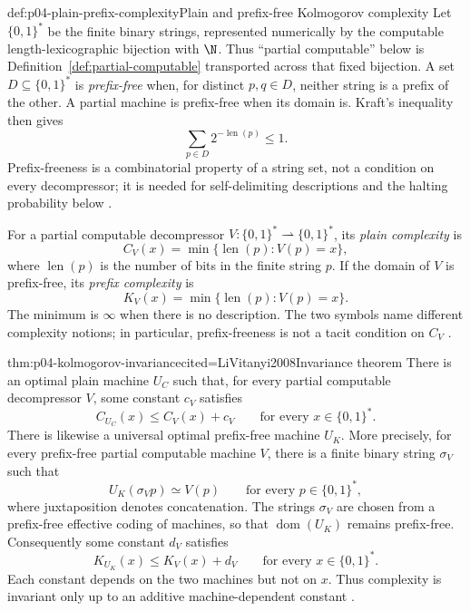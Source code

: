 \begin{hbdefinition}{def:p04-plain-prefix-complexity}{Plain and prefix-free Kolmogorov complexity}
Let \(\{0,1\}^*\) be the finite binary strings, represented numerically by
the computable length-lexicographic bijection with \(\N\).  Thus ``partial
computable'' below is Definition~\ref{def:partial-computable} transported
across that fixed bijection.  A set \(D\subseteq\{0,1\}^*\) is
\emph{prefix-free} when, for distinct \(p,q\in D\), neither string is a prefix
of the other.  A partial machine is prefix-free when its domain is.  Kraft's
inequality then gives
\[
 \sum_{p\in D}2^{-\operatorname{len}(p)}\leq1.
\]
Prefix-freeness is a combinatorial property of a string set, not a condition on
every decompressor; it is needed for self-delimiting descriptions and the
halting probability below \cite{LiVitanyi2008}.

For a partial computable
decompressor \(V:\{0,1\}^*\rightharpoonup\{0,1\}^*\), its \emph{plain
complexity} is
\[
 C_V(x)=\min\{\operatorname{len}(p):V(p)=x\},
\]
where \(\operatorname{len}(p)\) is the number of bits in the finite string
\(p\).
If the domain of \(V\) is prefix-free, its \emph{prefix complexity} is
\[
 K_V(x)=\min\{\operatorname{len}(p):V(p)=x\}.
\]
The minimum is \(\infty\) when there is no description.  The two symbols name
different complexity notions; in particular, prefix-freeness is not a tacit
condition on \(C_V\) \cite{Kolmogorov1965,LiVitanyi2008}.
\end{hbdefinition}

\begin{hbtheorem}{thm:p04-kolmogorov-invariance}{cited=LiVitanyi2008}{Invariance theorem}
There is an optimal plain machine \(U_C\) such that, for every partial
computable decompressor \(V\), some constant \(c_V\) satisfies
\[
 C_{U_C}(x)\leq C_V(x)+c_V
 \qquad\text{for every }x\in\{0,1\}^*.
\]
There is likewise a universal optimal prefix-free machine \(U_K\).  More
precisely, for every prefix-free partial computable machine \(V\), there is a
finite binary string \(\sigma_V\) such that
\[
 U_K(\sigma_Vp)\simeq V(p)\qquad\text{for every }p\in\{0,1\}^*,
\]
where juxtaposition denotes concatenation.  The strings \(\sigma_V\) are
chosen from a prefix-free effective coding of machines, so that
\(\operatorname{dom}(U_K)\) remains prefix-free.  Consequently
some constant \(d_V\) satisfies
\[
 K_{U_K}(x)\leq K_V(x)+d_V
 \qquad\text{for every }x\in\{0,1\}^*.
\]
Each constant depends on the two machines but not on \(x\).  Thus complexity
is invariant only up to an additive machine-dependent constant
\cite{Kolmogorov1965}.
\end{hbtheorem}

